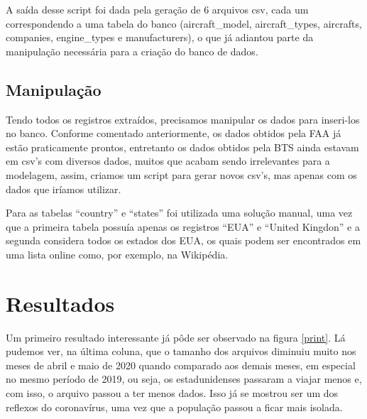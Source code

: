 \documentclass{article}
\begin{document}
	A saída desse script foi dada pela geração de 6 arquivos csv, cada um correspondendo a uma tabela do banco (aircraft\_model, aircraft\_types, aircrafts, companies, engine\_types e manufacturers), o que já adiantou parte da manipulação necessária para a criação do banco de dados.
	
	\subsection{Manipulação}
	
	Tendo todos os registros extraídos, precisamos manipular os dados para inseri-los no banco. Conforme comentado anteriormente, os dados obtidos pela FAA já estão praticamente prontos, entretanto os dados obtidos pela BTS ainda estavam em csv's com diversos dados, muitos que acabam sendo irrelevantes para a modelagem, assim, criamos um script para gerar novos csv's, mas apenas com os dados que iríamos utilizar. %
	
	Para as tabelas ``country'' e ``states'' foi utilizada uma solução manual, uma vez que a primeira tabela possuía apenas os registros ``EUA'' e ``United Kingdon'' e a segunda considera todos os estados dos EUA, os quais podem ser encontrados em uma lista online como, por exemplo, na Wikipédia.
	
	\section{Resultados}
	
	Um primeiro resultado interessante já pôde ser observado na figura \ref{print}. Lá pudemos ver, na última coluna, que o tamanho dos arquivos diminuiu muito nos meses de abril e maio de 2020 quando comparado aos demais meses, em especial no mesmo período de 2019, ou seja, os estadunidenses passaram a viajar menos e, com isso, o arquivo passou a ter menos dados. Isso já se mostrou ser um dos reflexos do coronavírus, uma vez que a população passou a ficar mais isolada.
	
	
	
	\printbibliography
	
\end{document}
